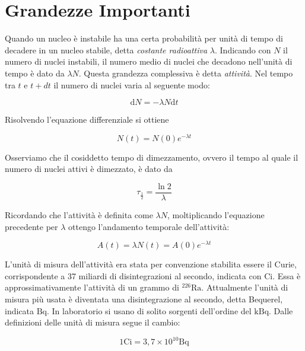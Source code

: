 \documentclass [a4paper, twoside] {book}
\begin{document}
\section{Grandezze Importanti}

Quando un nucleo è instabile ha una certa probabilità per unità di tempo di decadere in un nucleo stabile, detta \emph{costante radioattiva} $\lambda$. 
Indicando con $N$ il numero di nuclei instabili, il numero medio di nuclei che decadono nell'unità di tempo è dato da $\lambda N$. Questa grandezza complessiva è detta \emph{attività}. Nel tempo tra $t$ e $t+dt$ il numero di nuclei varia al seguente modo:

\begin{equation}
\mathrm{d}N=-\lambda N \mathrm{d}t
\end{equation}

Risolvendo l'equazione differenziale si ottiene

\begin{equation}
N(t)=N(0)e^{-\lambda t}
\end{equation}

Osserviamo che il cosiddetto tempo di dimezzamento, ovvero il tempo al quale il numero di nuclei attivi è dimezzato, è dato da

\begin{equation}
\tau_{\frac{1}{2}}=\frac{\ln2}{\lambda}
\end{equation}

Ricordando che l'attività è definita come $\lambda N$, moltiplicando l'equazione precedente per $\lambda$ ottengo l'andamento temporale dell'attività:

\begin{equation}
A(t)=\lambda N(t)=A(0)e^{-\lambda t}
\end{equation}

L'unità di misura dell'attività era stata per convenzione stabilita essere il Curie, corrispondente a 37 miliardi di disintegrazioni al secondo, indicata con $\text{Ci}$. Essa è approssimativamente l'attività di un grammo di $^{226}\text{Ra}$.
Attualmente l'unità di misura più usata è diventata una disintegrazione al secondo, detta Bequerel, indicata $\text{Bq}$.
In laboratorio si usano di solito sorgenti dell'ordine del $\text{kBq}$. Dalle definizioni delle unità di misura segue il cambio:

\begin{equation}
1 \text{Ci} = 3,7 \times 10^{10} \text{Bq}
\end{equation}
\end{document}
